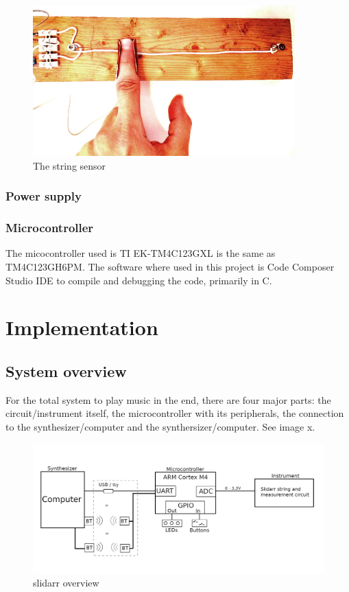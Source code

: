 \documentclass{article}
\begin{document}
\begin{figure}[h]
  \centering
  \includegraphics[width=0.9\textwidth]{string-sensor}
  \caption{The string sensor}
  \label{fig:string_sensor}
\end{figure}

\subsubsection{Power supply}

\subsubsection{Microcontroller}
The micocontroller used is TI EK-TM4C123GXL is the same as TM4C123GH6PM. The software where used in this project is Code Composer Studio IDE to compile and debugging the code, primarily in C.

\section{Implementation}

\subsection{System overview}
For the total system to play music in the end, there are four major parts: the circuit/instrument itself, the microcontroller with its peripherals, the connection to the synthesizer/computer and the synthersizer/computer. See image x.

\begin{figure}[ht]
  \centering
  \includegraphics[width=1\textwidth]{BasicSystemOverview.png}
  \caption{slidarr overview}
  \label{fig:slidarr overview}
\end{figure}
\end{document}
